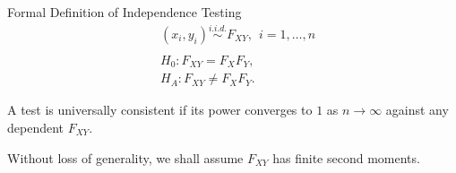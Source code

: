 \documentclass[mathserif,t]{beamer}
\begin{document}
\begin{frame}{Formal Definition of Independence Testing}
\begin{align*}
& (x_{i},y_{i}) \stackrel{i.i.d.}{\sim} F_{XY}, \ \ i=1, \ldots, n\\
& \\
& H_{0}: F_{XY}=F_{X}F_{Y},\\
& H_{A}: F_{XY} \neq F_{X}F_{Y}.
\end{align*}

\pause
\medskip
A test is universally consistent if its power converges to $1$ as $n \rightarrow \infty$ against any dependent $F_{XY}$.

\pause
\medskip
Without loss of generality, we shall assume $F_{XY}$ has finite second moments.


\end{frame}
\end{document}
